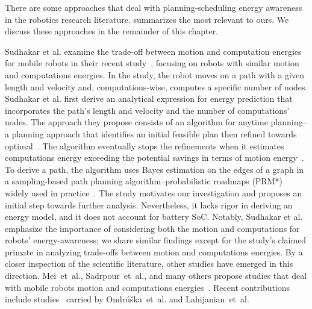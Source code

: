 There are some approaches that deal with planning-scheduling energy awareness in the robotics research literature.  summarizes the most relevant to ours. We discuss these approaches in the remainder of this chapter.

Sudhakar et al. examine the trade-off between motion and computation energies for mobile robots in their recent study~\citep{sudhakar2020balancing}, focusing on robots with similar motion and computations energies. In the study, the robot moves on a path with a given length and velocity and, computations-wise, computes a specific number of nodes. Sudhakar et al. first derive an analytical expression for energy prediction that incorporates the path's length and velocity and the number of computations' nodes. The approach they propose consists of an algorithm for anytime planning--a planning approach that identifies an initial feasible plan then refined towards optimal~\citep{karaman2011anytime}. The algorithm eventually stops the refinements when it estimates computations energy exceeding the potential savings in terms of motion energy~\citep{sudhakar2020balancing}. To derive a path, the algorithm uses Bayes estimation on the edges of a graph in a sampling-based path planning algorithm--probabilistic roadmaps (PRM*) widely used in practice~\citep{lavalle2006planning,karaman2011sampling}. The study motivates our investigation and proposes an initial step towards further analysis. Nevertheless, it lacks rigor in deriving an energy model, and it does not account for battery SoC. Notably, Sudhakar et al. emphasize the importance of considering both the motion and computations for robots' energy-awareness; we share similar findings except for the study's claimed primate in analyzing trade-offs between motion and computations energies. By a closer inspection of the scientific literature, other studies have emerged in this direction. Mei~et~al., Sadrpour~et~al., and many others propose studies that deal with mobile robots motion and computations energies~\citep{mei2005case,mei2006deployment,brateman2006energy,zhang2007low,sadrpour2013experimental,sadrpour2013mission}. Recent contributions include studies~\citep{ondruska2015scheduled,lahijanian2018resource} carried by Ondr\'{u}\v{s}ka~et~al. and Lahijanian~et~al.


